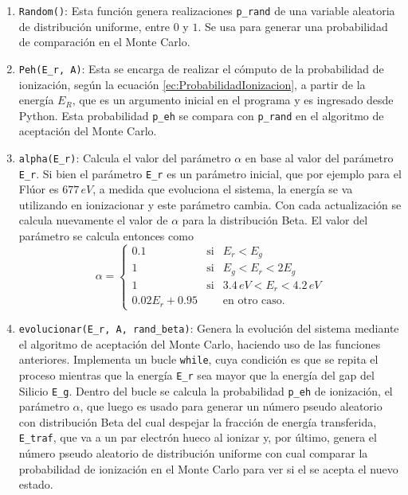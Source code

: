 \begin{enumerate}[label=\arabic*., listparindent=1.5em]
    \item \verb|Random()|: Esta función genera realizaciones \verb|p_rand| de una variable aleatoria de distribución uniforme, entre $0$ y $1$. Se usa para generar una probabilidad de comparación en el Monte Carlo.
    \item \verb|Peh(E_r, A)|: Esta se encarga de realizar el cómputo de la probabilidad de ionización, según la ecuación \eqref{ec:ProbabilidadIonizacion}, a partir de la energía $E_{R}$, que es un argumento inicial en el programa y es ingresado desde Python. Esta probabilidad \verb|p_eh| se compara con \verb|p_rand| en el algoritmo de aceptación del Monte Carlo.
    \item \verb|alpha(E_r)|: Calcula el valor del parámetro $\alpha$ en base al valor del parámetro \verb|E_r|. Si bien el parámetro \verb|E_r| es un parámetro inicial, que por ejemplo para el Flúor es $677\,\si{eV}$, a medida que evoluciona el sistema, la energía se va utilizando en ionizacionar y este parámetro cambia. Con cada actualización se calcula nuevamente el valor de $\alpha$ para la distribución Beta. El valor del parámetro se calcula entonces como
    \begin{equation*}
        \alpha =
        \left\{ \begin{array}{lcc}
             0.1 & \mbox{si} & E_{r} < E_{g}\\
             1 & \mbox{si} & E_{g} < E_{r} < 2E_{g}\\
             1 & \mbox{si} & 3.4\,\si{eV} < E_{r} < 4.2\,\si{eV}\\
             0.02E_{r} + 0.95 & & \mbox{en otro caso.}
             \end{array}
        \right.
    \end{equation*}
    \item \verb|evolucionar(E_r, A, rand_beta)|: Genera la evolución del sistema mediante el algoritmo de aceptación del Monte Carlo, haciendo uso de las funciones anteriores. Implementa un bucle \verb|while|, cuya condición es que se repita el proceso mientras que la energía \verb|E_r| sea mayor que la energía del gap del Silicio \verb|E_g|. Dentro del bucle se calcula la probabilidad \verb|p_eh| de ionización, el parámetro $\alpha$, que luego es usado para generar un número pseudo aleatorio con distribución Beta del cual despejar la fracción de energía transferida, \verb|E_traf|, que va a un par electrón hueco al ionizar y, por último, genera el número pseudo aleatorio de distribución uniforme con cual comparar la probabilidad de ionización en el Monte Carlo para ver si el se acepta el nuevo estado.\\

\end{enumerate}
